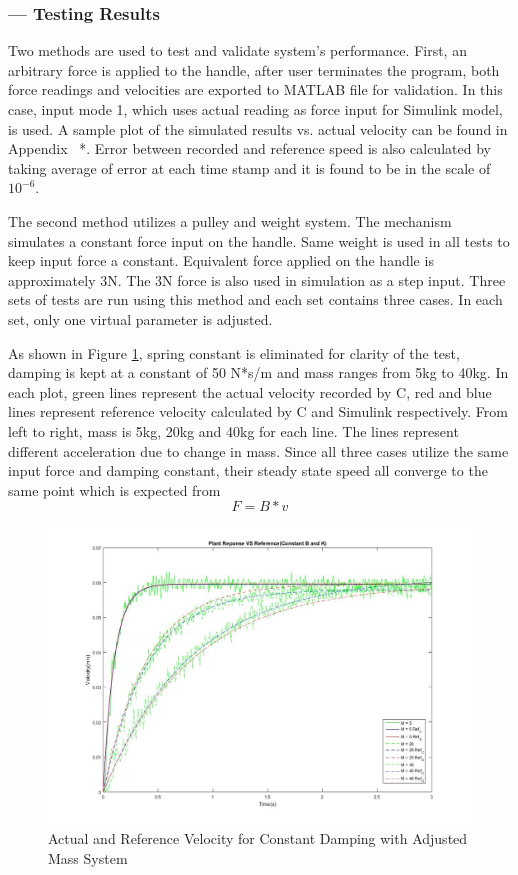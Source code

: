 \subsubsection*{ --- Testing Results}
Two methods are used to test and validate system's performance. First, an arbitrary force is applied to the handle, after user terminates the program, both force readings and velocities are exported to MATLAB file for validation. In this case, input mode 1, which uses actual reading as force input for Simulink model, is used. A sample plot of the simulated results vs. actual velocity can be found in Appendix {{\color{red}\ *}}. Error between recorded and reference speed is also calculated by taking average of error at each time stamp and it is found to be in the scale of $10^{-6}$. 

The second method utilizes a pulley and weight system. The mechanism simulates a constant force input on the handle. Same weight is used in all tests to keep input force a constant. Equivalent force applied on the handle is approximately 3N. The 3N force is also used in simulation as a step input. Three sets of tests are run using this method and each set contains three cases. In each set, only one virtual parameter is adjusted. 

As shown in Figure \ref{fig:MChange}, spring constant is eliminated for clarity of the test, damping is kept at a constant of 50 N*s/m and mass ranges from 5kg to 40kg. In each plot, green lines represent the actual velocity recorded by C, red and blue lines represent reference velocity calculated by C and Simulink respectively. From left to right, mass is 5kg, 20kg and 40kg for each line. The lines represent different acceleration due to change in mass.  Since all three cases utilize the same input force and damping constant, their steady state speed all converge to the same point which is expected from 
\begin{equation}
F=B*v
\end{equation}
\begin{figure}[H]
\centering
\includegraphics[width=1\linewidth]{Images/MChange}
\caption{Actual and Reference Velocity for Constant Damping with Adjusted Mass System}
\label{fig:MChange}
\end{figure}

